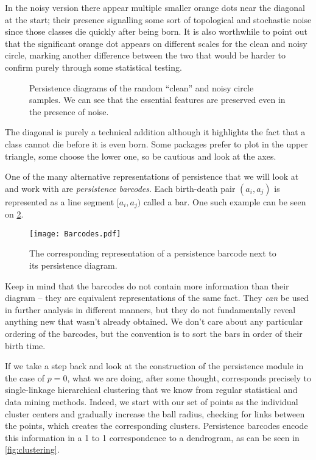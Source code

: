 In the noisy version there appear multiple smaller orange dots near the diagonal at the start; their presence signalling some sort of topological and stochastic noise since those classes die quickly after being born. It is also worthwhile to point out that the significant orange dot appears on different scales for the clean and noisy circle, marking another difference between the two that would be harder to confirm purely through some statistical testing.

\begin{figure}
    \centering
    \qquad
    \caption{Persistence diagrams of the random ``clean'' and noisy circle samples. We can see that the essential features are preserved even in the presence of noise.}
    \label{fig:clean_noisy_homologies}
\end{figure}

The diagonal is purely a technical addition although it highlights the fact that a class cannot die before it is even born. Some packages prefer to plot in the upper triangle, some choose the lower one, so be cautious and look at the axes.

One of the many alternative representations of persistence that we will look at and work with are \textit{persistence barcodes}. Each birth-death pair $(a_{i}, a_{j})$ is represented as a line segment $[a_{i}, a_{j})$ called a bar. One such example can be seen on \ref{fig:barcodes}.

\begin{figure}[h!]
  \centering
  \texttt{[image: Barcodes.pdf]}
  \caption{The corresponding representation of a persistence barcode next to its persistence diagram.}
  \label{fig:barcodes}
\end{figure}

Keep in mind that the barcodes do not contain more information than their diagram -- they are equivalent representations of the same fact. They \textit{can} be used in further analysis in different manners, but they do not fundamentally reveal anything new that wasn't already obtained. We don't care about any particular ordering of the barcodes, but the convention is to sort the bars in order of their birth time.

If we take a step back and look at the construction of the persistence module in the case of $p = 0$, what we are doing, after some thought, corresponds precisely to single-linkage hierarchical clustering that we know from regular statistical and data mining methods. Indeed, we start with our set of points as the individual cluster centers and gradually increase the ball radius, checking for links between the points, which creates the corresponding clusters. Persistence barcodes encode this information in a 1 to 1 correspondence to a dendrogram, as can be seen in \ref{fig:clustering}.

